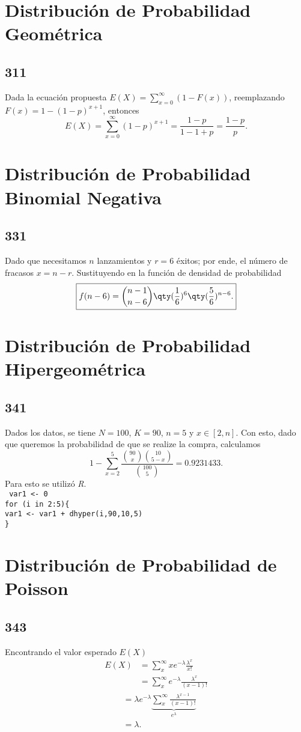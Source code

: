 \section{Distribución de Probabilidad Geométrica}
\subsection*{311}
Dada la ecuación propuesta $E(X) = \sum_{x = 0} ^\infty (1 - F(x))$, reemplazando $F(x) = 1 - (1 - p)^{x + 1}$, entonces
	$$ E(X) = \sum _{x = 0} ^\infty (1 - p)^{x + 1} = \frac{1 - p}{1 - 1 + p} = \frac{1 - p}{p}. $$

\section{Distribución de Probabilidad Binomial Negativa}
\subsection*{331}
Dado que necesitamos $n$ lanzamientos y $r = 6$ éxitos; por ende, el número de fracasos $x = n - r$. Sustituyendo en la función de densidad de probabilidad
	$$\boxed{f(n - 6) = \binom{n - 1}{n - 6} \qty(\frac{1}{6})^6 \qty(\frac{5}{6})^{n - 6} .}$$

\section{Distribución de Probabilidad Hipergeométrica}
\subsection*{341}
Dados los datos, se tiene $N = 100$, $K = 90$, $n = 5$ y $x \in [2,n]$. Con esto, dado que queremos la probabilidad de que se realize la compra, calculamos
	$$1 - \sum _{x = 2} ^5 \frac{\binom{90}{x} \binom{10}{5 - x}}{\binom{100}{5}} = 0.9231433.$$
Para esto se utilizó \textit{R}. \\
{\tt
var1 <- 0 \\
for (i in 2:5)\{ \\
var1 <- var1 + dhyper(i,90,10,5) \\
\}
}

\section{Distribución de Probabilidad de Poisson}
\subsection*{343}
Encontrando el valor esperado $E(X)$
\begin{align*}
	E(X) &= \sum _x ^\infty x e^{-\lambda} \frac{\lambda ^x}{x!} \\
	&= \sum _x ^\infty e^{-\lambda} \frac{\lambda ^x}{(x - 1)!}
\end{align*}
\begin{align*}
	&= \lambda e^{-\lambda} \underbrace{\sum _x ^\infty \frac{\lambda ^{x - 1}}{(x - 1)!}}_{e^\lambda} \\
	&= \lambda .
\end{align*}

